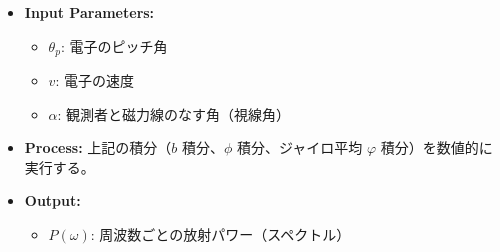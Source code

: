 \documentclass[a4paper,11pt]{bxjsarticle} %
\begin{document}
\begin{itemize}
    \item \textbf{Input Parameters:}
    \begin{itemize}
        \item $\theta_p$: 電子のピッチ角
        \item $v$: 電子の速度
        \item $\alpha$: 観測者と磁力線のなす角（視線角）
    \end{itemize}
    \item \textbf{Process:}
    上記の積分（$b$ 積分、$\phi$ 積分、ジャイロ平均 $\varphi$ 積分）を数値的に実行する。
    \item \textbf{Output:}
    \begin{itemize}
        \item $P(\omega)$: 周波数ごとの放射パワー（スペクトル）
    \end{itemize}
\end{itemize}








\end{document}
